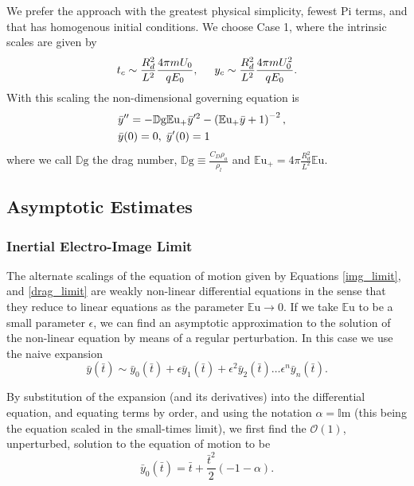 \documentclass[a4paper, 12pt]{article}
\begin{document}
We prefer the approach with the greatest physical simplicity, fewest Pi terms, and that has homogenous initial conditions. We choose Case 1, where the intrinsic scales are given by
\[ t_c \sim \frac{R_d^2}{L^2} \frac{4 \pi m U_0}{q E_0}, \hspace{5mm} y_c \sim \frac{R_d^2}{L^2} \frac{4 \pi m U_0^2}{q E_0}.
\]
With this scaling the non-dimensional governing equation is 
\begin{eqnarray}
&\bar{y}'' = - \mathbb{D}\mbox{g} \mathbb{E}\mbox{u}_+ \bar{y}'^2 - \left( \mathbb{E}\mbox{u}_+ \bar{y} + 1 \right)^{-2}, & \nonumber \\
& \bar{y}(0) = 0, \hspace{1 mm} \bar{y}'(0) = 1 & \label{drag_limit}
\end{eqnarray}
where we call $\mathbb{D}\mbox{g}$ the drag number, $\mathbb{D}\mbox{g} \equiv \frac{C_D \rho_a}{\rho_l}$ and $\mathbb{E}\mbox{u}_+ = 4 \pi \frac{R_d^2}{L^2} \mathbb{E}\mbox{u}$.

\subsection{Asymptotic Estimates}
\subsubsection{Inertial Electro-Image Limit}

The alternate scalings of the equation of motion given by Equations \ref{img_limit}, and \ref{drag_limit} are weakly non-linear differential equations in the sense that they reduce to linear equations as the parameter $\mathbb{E}\mbox{u} \rightarrow 0$. If we take $\mathbb{E}\mbox{u}$ to be a small parameter $\epsilon$, we can find an asymptotic approximation to the solution of the non-linear equation by means of a regular perturbation. In this case we use the naive expansion
\[ \bar{y}(\bar{t}) \sim \bar{y}_0(\bar{t}) + \epsilon \bar{y}_1(\bar{t}) + \epsilon^2 \bar{y}_2(\bar{t}) \ldots \epsilon^n\bar{y}_n(\bar{t})  
.\]

By substitution of the expansion (and its derivatives) into the differential equation, and equating terms by order, and using the notation $\alpha = \mathbb{I}\mbox{m}$ (this being the equation scaled in the small-times limit), we first find the $\mathcal{O}(1)$, unperturbed, solution to the equation of motion to be
\[{\bar{y}_{0}}{\left (\bar{t} \right )} = \bar{t} + \frac{\bar{t}^{2}}{2} \left(-1 - \alpha\right). \]
\end{document}
